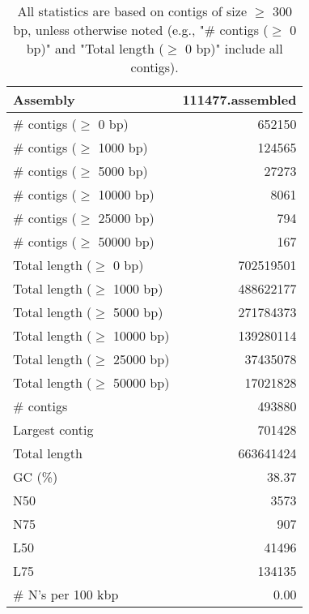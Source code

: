 \documentclass[12pt,a4paper]{article}
\begin{document}
\begin{table}[ht]
\begin{center}
\caption{All statistics are based on contigs of size $\geq$ 300 bp, unless otherwise noted (e.g., "\# contigs ($\geq$ 0 bp)" and "Total length ($\geq$ 0 bp)" include all contigs).}
\begin{tabular}{|l*{1}{|r}|}
\hline
Assembly & 111477.assembled \\ \hline
\# contigs ($\geq$ 0 bp) & 652150 \\ \hline
\# contigs ($\geq$ 1000 bp) & 124565 \\ \hline
\# contigs ($\geq$ 5000 bp) & 27273 \\ \hline
\# contigs ($\geq$ 10000 bp) & 8061 \\ \hline
\# contigs ($\geq$ 25000 bp) & 794 \\ \hline
\# contigs ($\geq$ 50000 bp) & 167 \\ \hline
Total length ($\geq$ 0 bp) & 702519501 \\ \hline
Total length ($\geq$ 1000 bp) & 488622177 \\ \hline
Total length ($\geq$ 5000 bp) & 271784373 \\ \hline
Total length ($\geq$ 10000 bp) & 139280114 \\ \hline
Total length ($\geq$ 25000 bp) & 37435078 \\ \hline
Total length ($\geq$ 50000 bp) & 17021828 \\ \hline
\# contigs & 493880 \\ \hline
Largest contig & 701428 \\ \hline
Total length & 663641424 \\ \hline
GC (\%) & 38.37 \\ \hline
N50 & 3573 \\ \hline
N75 & 907 \\ \hline
L50 & 41496 \\ \hline
L75 & 134135 \\ \hline
\# N's per 100 kbp & 0.00 \\ \hline
\end{tabular}
\end{center}
\end{table}
\end{document}

